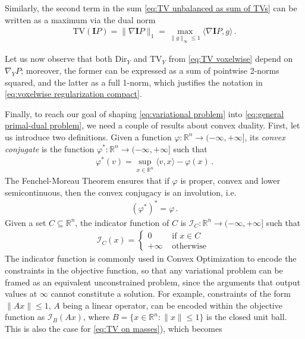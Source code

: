 \documentclass[journal,twoside,web]{ieeecolor}
\newcommand{\R}{\mathbb{R}}
\begin{document}
Similarly, the second term in the sum \eqref{eq:TV unbalanced as sum of TVs} can be written as a maximum via the dual norm
\begin{align} \label{eq:TV on masses}
    \mathrm{TV}(\mathbf{I}P) = \| \nabla \mathbf{I}P\|_1 = \max_{ \| g \|_\infty \le 1 } \langle \nabla \mathbf{I} P , g \rangle \, .
\end{align}

Let us now observe that both $\mathrm{Dir}_Y$ and $\mathrm{TV}_Y$ from \eqref{eq:TV voxelwise} depend on $\nabla_Y P$; moreover, the former can be expressed as a sum of pointwise 2-norms squared, and the latter as a full 1-norm, which justifies the notation in \eqref{eq:voxelwise regularization compact}.

Finally, to reach our goal of shaping \eqref{eq:variational problem} into \eqref{eq:general primal-dual problem}, we need a couple of results about convex duality. First, let us introduce two definitions. Given a function $\varphi:\R^n \to (-\infty,+\infty]$, its \textit{convex conjugate} is the function $\varphi^*:\R^n \to (-\infty, + \infty]$ such that
\begin{align*}
    \varphi^*(v) = \sup_{x \in \R^n} \langle v,x \rangle - \varphi(x) \, .
\end{align*}
The Fenchel-Moreau Theorem ensures that if $\varphi$ is proper, convex and lower semicontinuous, then the convex conjugacy is an involution, i.e.
\begin{align*}
    (\varphi^{*})^* = \varphi \, .
\end{align*}
Given a set $C \subseteq \R^n$, the indicator function of $C$ is $\mathcal{I}_C:\R^n \to (-\infty,+\infty]$ such that
\begin{align*}
    \mathcal{I}_C(x) =
    \begin{cases}
        0 & \text{ if } x \in C\\
        +\infty & \text{ otherwise } 
    \end{cases}
\end{align*}
The indicator function is commonly used in Convex Optimization to encode the constraints in the objective function, so that any variational problem can be framed as an  equivalent unconstrained problem, since the arguments that output values at $\infty$ cannot constitute a solution. For example, constraints of the form $\|Ax\|\le 1$, $A$ being a linear operator, can be encoded within the objective function as $\mathcal{I}_B(Ax)$, where $B = \{ x\in \R^n : \|x\| \le 1 \}$ is the closed unit ball. This is also the case for \eqref{eq:TV on masses}), which becomes
\end{document}
